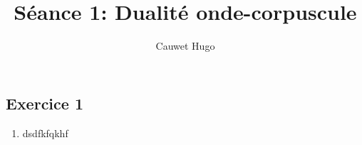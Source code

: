 \documentclass[12pt,a4paper]{scrartcl}
\title{Séance 1: Dualité onde-corpuscule}
\author{Cauwet Hugo}
\date{}
\begin{document}
\maketitle
\subsection*{Exercice 1}
\begin{enumerate}
    \item dsdfkfqkhf
\end{enumerate}
\end{document}
